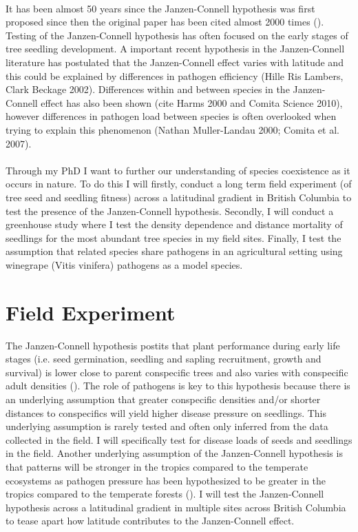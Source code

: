 \documentclass{article}
\begin{document}
\paragraph{}It has been almost 50 years since the Janzen-Connell hypothesis was first proposed since then the original paper has been cited almost 2000 times (\citep{Comita2014}). Testing of the Janzen-Connell hypothesis has often focused on the early stages of tree seedling development. A important recent hypothesis in the Janzen-Connell literature has postulated that the Janzen-Connell effect varies with latitude and this could be explained by differences in pathogen efficiency (Hille Ris Lambers, Clark Beckage 2002). Differences within and between species in the Janzen-Connell effect has also been shown (cite Harms 2000 and Comita Science 2010), however differences in pathogen load between species is often overlooked when trying to explain this phenomenon (Nathan Muller-Landau 2000; Comita et al. 2007). 

\paragraph{}Through my PhD I want to further our understanding of species coexistence as it occurs in nature. To do this I will firstly, conduct a long term field experiment (of tree seed and seedling fitness) across a latitudinal gradient in British Columbia to test the presence of the Janzen-Connell hypothesis. Secondly, I will conduct a greenhouse study where I test the density dependence and distance mortality of seedlings for the most abundant tree species in my field sites. Finally, I test the assumption that related species share pathogens in an agricultural setting using winegrape (Vitis vinifera) pathogens as a model species. 

\section{Field Experiment}
The Janzen-Connell hypothesis postits that plant performance during early life stages (i.e. seed germination, seedling and sapling recruitment, growth and survival) is lower close to parent conspecific trees and also varies with conspecific adult densities (\citep{Comita2014}). The role of pathogens is key to this hypothesis because there is an underlying assumption that greater conspecific densities and/or shorter distances to conspecifics will yield higher disease pressure on seedlings. This underlying assumption is rarely tested and often only inferred from the data collected in the field. I will specifically test for disease loads of seeds and seedlings in the field. Another underlying assumption of the Janzen-Connell hypothesis is that patterns will be stronger in the tropics compared to the temperate ecosystems as pathogen pressure has been hypothesized to be greater in the tropics compared to the temperate forests (\citep{Comita2014}). I will test the Janzen-Connell hypothesis across a latitudinal gradient in multiple sites across British Columbia to tease apart how latitude contributes to the Janzen-Connell effect. 
\end{document}
